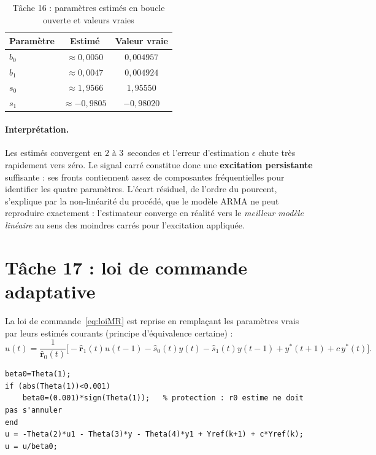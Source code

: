 \documentclass[11pt,a4paper]{report}
\begin{document}
\begin{table}[htbp]
\centering
\caption{Tâche 16 : paramètres estimés en boucle ouverte et valeurs vraies}
\label{tab:t16}
\begin{tabular}{lcc}
\toprule
Paramètre & Estimé & Valeur vraie \\
\midrule
$b_0$ & $\approx 0{,}0050$   & $0{,}004957$ \\
$b_1$ & $\approx 0{,}0047$   & $0{,}004924$ \\
$s_0$ & $\approx 1{,}9566$   & $1{,}95550$ \\
$s_1$ & $\approx -0{,}9805$  & $-0{,}98020$ \\
\bottomrule
\end{tabular}
\end{table}

\paragraph{Interprétation.} Les estimés convergent en $2$ à $3$~secondes et l'erreur
d'estimation $\epsilon$ chute très rapidement vers zéro. Le signal carré constitue donc une
\textbf{excitation persistante} suffisante : ses fronts contiennent assez de composantes
fréquentielles pour identifier les quatre paramètres. L'écart résiduel, de l'ordre du pourcent,
s'explique par la non-linéarité du procédé, que le modèle ARMA ne peut reproduire exactement :
l'estimateur converge en réalité vers le \emph{meilleur modèle linéaire} au sens des moindres
carrés pour l'excitation appliquée.

\section{Tâche 17 : loi de commande adaptative}

La loi de commande~\eqref{eq:loiMR} est reprise en remplaçant les paramètres vrais par leurs
estimés courants (principe d'équivalence certaine) :
\begin{equation}
  u(t) = \frac{1}{\hat{\boldsymbol{r}}_0(t)}
  \Big[-\hat{\boldsymbol{r}}_1(t)u(t-1) - \hat{s}_0(t)y(t) - \hat{s}_1(t)y(t-1)
  + y^*(t+1) + c\,y^*(t)\Big].
\end{equation}

\begin{lstlisting}[caption={Tâche 17 : loi de commande adaptative}]
beta0=Theta(1);
if (abs(Theta(1))<0.001)
    beta0=(0.001)*sign(Theta(1));   % protection : r0 estime ne doit pas s'annuler
end
u = -Theta(2)*u1 - Theta(3)*y - Theta(4)*y1 + Yref(k+1) + c*Yref(k);
u = u/beta0;
\end{lstlisting}
\end{document}
